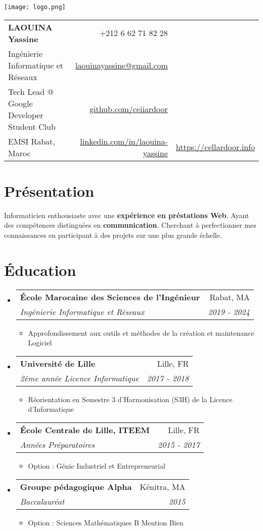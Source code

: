 \documentclass[a4paper,11pt]{article}
\makeatletter
\newcommand{\resitem}[1]{\item #1 \vspace{-1pt}}
\newcommand{\ressubheading}[4]{
\begin{tabular*}{6.5in}{l@{\cftdotfill{\cftsecdotsep}\extracolsep{\fill}}r}
		\textbf{#1} & #2 \\
		\textit{#3} & \textit{#4} \\
\end{tabular*}\vspace{-6pt}}
\newcommand{\name}{LAOUINA Yassine}
\newcommand{\course}{Ingénierie Informatique et Réseaux}
\newcommand{\phone}{62 71 82 28}
\newcommand{\emaila}{laouinayassine@gmail.com}
\newcommand{\github}{github.com/ceiiardoor}
\newcommand{\website}{https://cellardoor.info}
\newcommand{\linkedin}{linkedin.com/in/laouina-yassine}
\makeatother
\begin{document}
\selectfont

\parbox{2.35cm}{

\texttt{[image: logo.png]}

}
\parbox{\dimexpr\linewidth-2.8cm\relax}{
\begin{tabularx}{\linewidth}{L r}
  \textbf{\LARGE \name} & +212 6 \phone\\
  
  \course &  \href{mailto:\emaila}{\emaila}\\
   {Tech Lead @ Google Developer Student Club} &  \href{https://github.com/ceiiardoor}{\github} \\ 
  {EMSI Rabat, Maroc} & \href{https://www.linkedin.com/in/laouina-yassine/}{\linkedin} & \href{https://cellardoor.info/}{\website} 
\end{tabularx}
}
\vspace{-3mm}

\section{\textbf{Présentation}}
Informaticien enthousiaste avec une \textbf{expérience en préstations Web}. Ayant des compétences distinguées en \textbf{communication}. Cherchant à perfectionner mes connaissances en participant à des projets sur une plus grande échelle.

\vspace{-3mm}
\section{\textbf{Éducation}}
\setlength{\tabcolsep}{5pt} 

\begin{itemize}
\item
	\ressubheading{École Marocaine des Sciences de l'Ingénieur}{Rabat, MA}{Ingénierie Informatique et Réseaux}{2019 - 2024}
	\begin{itemize}
		\resitem{Approfondissement aux outils et méthodes de la création et maintenance Logiciel}
	\end{itemize}

\item
	\ressubheading{Université de Lille}{Lille, FR}{2ème année Licence Informatique}{2017 - 2018}
	\begin{itemize}
		\resitem{Réorientation en Semestre 3 d'Harmonisation (S3H) de la Licence d'Informatique}
	\end{itemize}
	
\item
	\ressubheading{École Centrale de Lille, ITEEM}{Lille, FR}{Années Préparatoires}{2015 - 2017}
	\begin{itemize}
		\resitem{Option : Génie Industriel et Entrepreneurial}
	\end{itemize}
	
\item
	\ressubheading{Groupe pédagogique Alpha}{Kénitra, MA}{Baccalauréat}{2015}
	\begin{itemize}
		\resitem{Option : Sciences Mathématiques B Mention Bien}
	\end{itemize}	
\end{itemize}
\vspace{-5mm}
\end{document}
